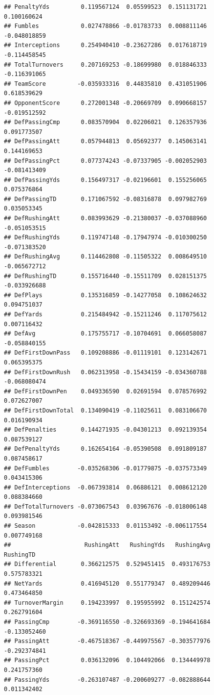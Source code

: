 \documentclass[
]{book}
\begin{document}
\begin{verbatim}
## PenaltyYds         0.119567124  0.05599523  0.151131721  0.100160624
## Fumbles            0.027478866 -0.01783733  0.008811146 -0.048018859
## Interceptions      0.254940410 -0.23627286  0.017618719 -0.114458545
## TotalTurnovers     0.207169253 -0.18699980  0.018846333 -0.116391065
## TeamScore         -0.035933316  0.44835810  0.431051906  0.618539629
## OpponentScore      0.272001348 -0.20669709  0.090668157 -0.019512592
## DefPassingCmp      0.083570904  0.02206021  0.126357936  0.091773507
## DefPassingAtt      0.057944813  0.05692377  0.145063141  0.144169653
## DefPassingPct      0.077374243 -0.07337905 -0.002052903 -0.081413409
## DefPassingYds      0.156497317 -0.02196601  0.155256065  0.075376864
## DefPassingTD       0.171067592 -0.08316878  0.097982769  0.035053345
## DefRushingAtt      0.083993629 -0.21380037 -0.037088960 -0.051053515
## DefRushingYds      0.119747148 -0.17947974 -0.010300250 -0.071383520
## DefRushingAvg      0.114462808 -0.11505322  0.008649510 -0.065672712
## DefRushingTD       0.155716440 -0.15511709  0.028151375 -0.033926688
## DefPlays           0.135316859 -0.14277058  0.108624632  0.094751037
## DefYards           0.215484942 -0.15211246  0.117075612  0.007116432
## DefAvg             0.175755717 -0.10704691  0.066058087 -0.058840155
## DefFirstDownPass   0.109208886 -0.01119101  0.123142671  0.065395375
## DefFirstDownRush   0.062313958 -0.15434159 -0.034360788 -0.068080474
## DefFirstDownPen    0.049336590  0.02691594  0.078576992  0.072627007
## DefFirstDownTotal  0.134090419 -0.11025611  0.083106670  0.016190934
## DefPenalties       0.144271935 -0.04301213  0.092139354  0.087539127
## DefPenaltyYds      0.162654164 -0.05390508  0.091809187  0.087458617
## DefFumbles        -0.035268306 -0.01779875 -0.037573349  0.043415306
## DefInterceptions  -0.067393814  0.06886121  0.008612120  0.088384660
## DefTotalTurnovers -0.073067543  0.03967676 -0.018006148  0.093981546
## Season            -0.042815333  0.01153492 -0.006117554  0.007749168
##                     RushingAtt   RushingYds   RushingAvg    RushingTD
## Differential       0.366212575  0.529451415  0.493176753  0.575783321
## NetYards           0.416945120  0.551779347  0.489209446  0.473464850
## TurnoverMargin     0.194233997  0.195955992  0.151242574  0.262791604
## PassingCmp        -0.369116550 -0.326693369 -0.194641684 -0.133052460
## PassingAtt        -0.467518367 -0.449975567 -0.303577976 -0.292374841
## PassingPct         0.036132096  0.104492066  0.134449978  0.241757360
## PassingYds        -0.263107487 -0.200609277 -0.082888644  0.011342402

\end{verbatim}
\end{document}
